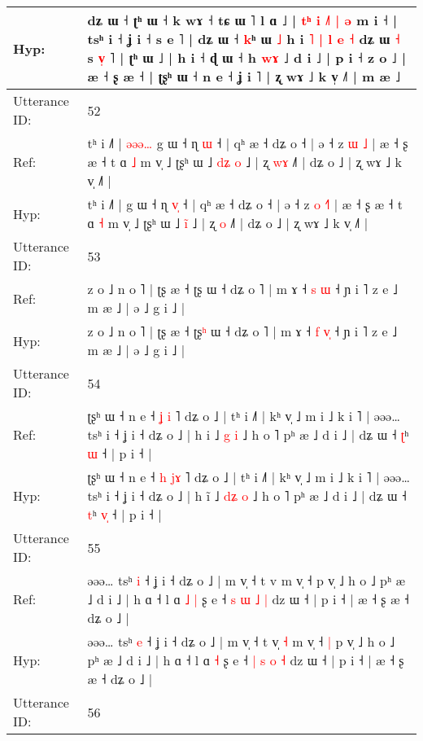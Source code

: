 \documentclass[10pt]{article}
\DeclareRobustCommand{\hl}[1]{{\textcolor{red}{#1}}}
\begin{document}
\begin{longtable}{ll}
 \\
Hyp: & dʑ ɯ ˧ ʈʰ ɯ ˧ k wɤ ˧ tɕ ɯ ˥ l ɑ ˩ |\hl{ }\hl{t}\hl{ʰ}\hl{ }\hl{i}\hl{ }\hl{˩}\hl{˥} \hl{|} \hl{ə} m i ˧ | tsʰ i ˧ ʝ i ˧ s e ˥ | dʑ ɯ ˧ \hl{k}ʰ ɯ\hl{}\hl{} \hl{˩} h i \hl{˥} \hl{|} \hl{l} \hl{e} \hl{˧} dʑ ɯ \hl{˧} s \hl{v}\hl{̩} ˥ | ʈʰ ɯ ˩\hl{} | h i ˧ ɖ ɯ ˧ h \hl{w}\hl{ɤ} ˩ d i ˩ | p i ˧ z o ˩ | æ ˧ ʂ æ ˧ | ʈʂʰ ɯ ˧ n e ˧ ʝ i ˥ | ʐ wɤ ˩ k v̩ ˩˥ | m æ ˩
 \\
\midrule
Utterance ID: & 52 \\
Ref: & tʰ i ˩˥ |\hl{ }\hl{ə}\hl{ə}\hl{ə}\hl{…} g ɯ ˧ ɳ \hl{}\hl{ɯ} ˧ | qʰ æ ˧ dʑ o ˧ | ə ˧ z \hl{ɯ} \hl{}\hl{˩} | æ ˧ ʂ æ ˧ t ɑ \hl{˩} m v̩ ˩ ʈʂʰ ɯ ˩ \hl{d}\hl{ʑ}\hl{ }\hl{o} ˩ | ʐ \hl{w}\hl{ɤ} ˩˥ | dʑ o ˩ | ʐ wɤ ˩ k v̩ ˩˥ |
 \\
Hyp: & tʰ i ˩˥ |\hl{}\hl{}\hl{}\hl{}\hl{} g ɯ ˧ ɳ \hl{v}\hl{̩} ˧ | qʰ æ ˧ dʑ o ˧ | ə ˧ z \hl{o} \hl{˧}\hl{˥} | æ ˧ ʂ æ ˧ t ɑ \hl{˧} m v̩ ˩ ʈʂʰ ɯ ˩ \hl{}\hl{}\hl{i}\hl{̃} ˩ | ʐ \hl{}\hl{o} ˩˥ | dʑ o ˩ | ʐ wɤ ˩ k v̩ ˩˥ |
 \\
\midrule
Utterance ID: & 53 \\
Ref: & z o ˩ n o ˥ | ʈʂ æ ˧ ʈʂ\hl{} ɯ ˧ dʑ o ˥ | m ɤ ˧ \hl{s} \hl{}\hl{ɯ} ˧ ɲ i ˥ z e ˩ m æ ˩ | ə ˩ g i ˩ |
 \\
Hyp: & z o ˩ n o ˥ | ʈʂ æ ˧ ʈʂ\hl{ʰ} ɯ ˧ dʑ o ˥ | m ɤ ˧ \hl{f} \hl{v}\hl{̩} ˧ ɲ i ˥ z e ˩ m æ ˩ | ə ˩ g i ˩ |
 \\
\midrule
Utterance ID: & 54 \\
Ref: & ʈʂʰ ɯ ˧ n e ˧ \hl{ʝ} \hl{}\hl{i} ˥ dʑ o ˩ | tʰ i ˩˥ | kʰ v̩ ˩ m i ˩ k i ˥ | əəə… tsʰ i ˧ ʝ i ˧ dʑ o ˩ | h i\hl{} ˩ \hl{}\hl{g} \hl{i} ˩ h o ˥ pʰ æ ˩ d i ˩ | dʑ ɯ ˧ \hl{ʈ}ʰ \hl{}\hl{ɯ} ˧ | p i ˧ |
 \\
Hyp: & ʈʂʰ ɯ ˧ n e ˧ \hl{h} \hl{j}\hl{ɤ} ˥ dʑ o ˩ | tʰ i ˩˥ | kʰ v̩ ˩ m i ˩ k i ˥ | əəə… tsʰ i ˧ ʝ i ˧ dʑ o ˩ | h i\hl{̃} ˩ \hl{d}\hl{ʑ} \hl{o} ˩ h o ˥ pʰ æ ˩ d i ˩ | dʑ ɯ ˧ \hl{t}ʰ \hl{v}\hl{̩} ˧ | p i ˧ |
 \\
\midrule
Utterance ID: & 55 \\
Ref: & əəə… tsʰ \hl{i} ˧ ʝ i ˧ dʑ o ˩ | m v̩ ˧ t v\hl{}\hl{}\hl{} m v̩ ˧\hl{}\hl{} p v̩ ˩ h o ˩ pʰ æ ˩ d i ˩ | h ɑ ˧ l ɑ\hl{ }\hl{˩} \hl{|} ʂ e ˧ \hl{s} \hl{ɯ} \hl{˩} \hl{|} dz ɯ ˧ | p i ˧ | æ ˧ ʂ æ ˧ dʑ o ˩ |
 \\
Hyp: & əəə… tsʰ \hl{e} ˧ ʝ i ˧ dʑ o ˩ | m v̩ ˧ t v\hl{̩}\hl{ }\hl{˧} m v̩ ˧\hl{ }\hl{|} p v̩ ˩ h o ˩ pʰ æ ˩ d i ˩ | h ɑ ˧ l ɑ\hl{}\hl{} \hl{˧} ʂ e ˧ \hl{|} \hl{s} \hl{o} \hl{˧} dz ɯ ˧ | p i ˧ | æ ˧ ʂ æ ˧ dʑ o ˩ |
 \\
\midrule
Utterance ID: & 56 \\

\end{longtable}
\end{document}

